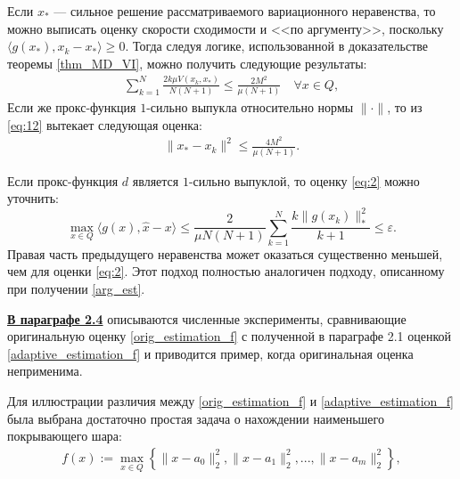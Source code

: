 \begin{remark}
    Если $x_*$ --- сильное решение рассматриваемого вариационного не\-равенства, то можно выписать оценку скорости сходимости и <<по аргументу>>, поскольку $\langle g(x_*), x_k - x_*\rangle \geq 0$. Тогда следуя логике, использованной в доказательстве теоремы \ref{thm_MD_VI}, можно получить следующие результаты: 
        \begin{equation} \label{eq:12}
        \begin{aligned} 
            \sum_{k=1}^{N} \frac{2k\mu V(x_k, x_*)}{N(N+1)} \leq \frac{2M^2}{\mu(N+1)} \quad  \forall x \in Q,
        \end{aligned}
        \end{equation}
    Если же прокс-функция $1$-сильно выпукла относительно нормы $\|\cdot\|$, то из \eqref{eq:12} вытекает следующая оценка:
        \begin{equation} 
        \begin{aligned} 
            \|x_* - x_k\|^2 \leq \frac{4M^2}{\mu(N+1)}.
        \end{aligned}
        \end{equation}
\end{remark}
\begin{remark}
    Если прокс-функция $d$ является $1$-сильно выпуклой, то оценку \eqref{eq:2} можно уточнить:
    \begin{equation}
        \max_{x \in Q} \langle g(x), \widehat{x} - x \rangle \leq \frac{2}{\mu N (N+1)} \sum_{k=1}^{N} \frac{k \|g(x_k)\|_*^2}{k+1} \leq \varepsilon.
    \end{equation}
    Правая часть предыдущего неравенства может оказаться существенно меньшей, чем для оценки \eqref{eq:2}. Этот подход полностью аналогичен подходу, описанному при получении \eqref{arg_est}.
\end{remark}

\underline{\textbf{В параграфе 2.4}} описываются численные эксперименты, сравнивающие оригинальную оценку \eqref{orig_estimation_f} с полученной в параграфе 2.1 оценкой \eqref{adaptive_estimation_f} и приводится пример, когда оригинальная оценка неприменима. 

Для иллюстрации различия между \eqref{orig_estimation_f} и \eqref{adaptive_estimation_f} была выбрана достаточно простая задача о нахождении наименьшего покрывающего шара:
\begin{gather}\label{sphere_cover_strongly}
    f(x) := \max_{x\in Q}\left\{\|x - a_0\|_2^2, \|x - a_1\|_2^2, ..., \|x - a_m\|_2^2\right\},
\end{gather}

